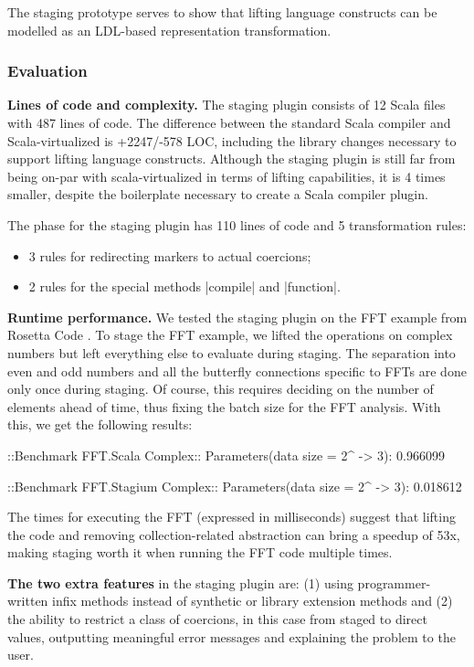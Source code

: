 The staging prototype serves to show that lifting language constructs can be modelled as an LDL-based representation transformation.

\subsubsection*{Evaluation}

\textbf{Lines of code and complexity.} The staging plugin consists of 12 Scala files with 487 lines of code. The difference between the standard Scala compiler and Scala-virtualized is +2247/-578 LOC, including the library changes necessary to support lifting language constructs. Although the staging plugin is still far from being on-par with scala-virtualized in terms of lifting capabilities, it is 4 times smaller, despite the boilerplate necessary to create a Scala compiler plugin.

The \commit{} phase for the staging plugin has 110 lines of code and 5 transformation rules:
\begin{itemize}
\item  3 rules for redirecting markers to actual coercions;
\item  2 rules for the special methods |compile| and |function|.
\end{itemize}

\textbf{Runtime performance.} We tested the staging plugin on the FFT example from Rosetta Code \cite{rosetta-code}. To stage the FFT example, we lifted the operations on complex numbers but left everything else to evaluate during staging. The separation into even and odd numbers and all the butterfly connections specific to FFTs are done only once during staging. Of course, this requires deciding on the number of elements ahead of time, thus fixing the batch size for the FFT analysis. With this, we get the following results:

\begin{lstlisting-nobreak}
 ::Benchmark FFT.Scala Complex::
 Parameters(data size = 2^ -> 3): 0.966099

 ::Benchmark FFT.Stagium Complex::
 Parameters(data size = 2^ -> 3): 0.018612
\end{lstlisting-nobreak}

The times for executing the FFT (expressed in milliseconds) suggest that lifting the code and removing collection-related abstraction can bring a speedup of 53x, making staging worth it when running the FFT code multiple times.

\textbf{The two extra features} in the staging plugin are: (1) using programmer-written infix methods instead of synthetic or library extension methods and (2) the ability to restrict a class of coercions, in this case from staged to direct values, outputting meaningful error messages and explaining the problem to the user.

